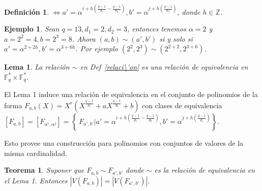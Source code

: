 \documentclass[landscape,final,paperwidth=24in,paperheight=36in]{baposter}
\newtheorem*{ejemplo*}{Ejemplo}
\newtheorem{definicion}{Definici\'on}
\newtheorem{lema}{Lema}
\newtheorem{teorema}{Teorema}
\begin{document}
\begin{poster}
{\begin{definicion}
  $\Longleftrightarrow a' = \alpha^{i+h(\frac{q-1}{d_1} - \frac{q-1}{d_2})}, b' = \alpha^{j+h(\frac{q-1}{d_1})}$, donde $h \in \mathbb{Z}$.

\end{definicion}

  \begin{ejemplo*}
    Sean $q = 13, d_1 = 2, d_2 = 3$, entonces tenemos $\alpha = 2$ y $a = 2^2 = 4, b = 2^3 = 8$. Ahora $(a,b) \sim (a',b')$ si y solo si
    $a' = \alpha^{2+2h}, b' = \alpha^{3+6h}$. Por ejemplo $(2^2,2^3) \sim (2^{2+2},2^{3+6})$.
  \end{ejemplo*}

\begin{lema}
  
  La relaci\'on $\sim$ en Def~\ref{relaci\'on} es una relaci\'on de equivalencia en $\mathbb{F}_q^* \times \mathbb{F}_q^*$.

\end{lema}

  El Lema 1 induce una relaci\'on de equivalencia en el conjunto de polinomios de la forma $F_{a,b}(X) = X^r(X^{\frac{q-1}{d_1}} + aX^{\frac{q-1}{d_2}} +b)$ con clases de equivalencia $[F_{a,b}] = [F_{\alpha^i, \alpha^j}] = \left\{\ F_{a',b'} | a' = \alpha^{i+h(\frac{q-1}{d_1} - \frac{q-1}{d_2})}, b' = \alpha^{j+h(\frac{q-1}{d_1})} \right\}$.

  Esto provee una construcci\'{o}n para polinomios con conjuntos de valores de la misma cardinalidad.
\begin{teorema}
  
  Suponer que $F_{a,b} \sim F_{a',b'}$ donde $\sim$ es la relaci\'on de equivalencia en el Lema 1. Entonces $|V(F_{a,b})| = |V(F_{a',b'})|$.

\end{teorema}
   

 }\label{valuesets}


  \label{Motivation}



\end{poster}
\end{document}
